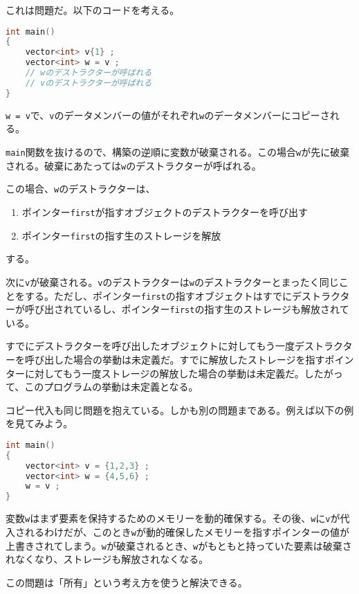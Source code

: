 これは問題だ。以下のコードを考える。

\begin{lstlisting}[language={C++}]
int main()
{
    vector<int> v{1} ;
    vector<int> w = v ;
    // wのデストラクターが呼ばれる
    // vのデストラクターが呼ばれる
}
\end{lstlisting}

\texttt{w = v}で、\texttt{v}のデータメンバーの値がそれぞれ\texttt{w}のデータメンバーにコピーされる。

\texttt{main}関数を抜けるので、構築の逆順に変数が破棄される。この場合\texttt{w}が先に破棄される。破棄にあたっては\texttt{w}のデストラクターが呼ばれる。

この場合、\texttt{w}のデストラクターは、
\begin{enumerate}
\def\labelenumi{\arabic{enumi}.}
\item
  ポインター\texttt{first}が指すオブジェクトのデストラクターを呼び出す
\item
  ポインター\texttt{first}の指す生のストレージを解放
\end{enumerate}
する。

次に\texttt{v}が破棄される。\texttt{v}のデストラクターは\texttt{w}のデストラクターとまったく同じことをする。ただし、ポインター\texttt{first}の指すオブジェクトはすでにデストラクターが呼び出されているし、ポインター\texttt{first}の指す生のストレージも解放されている。

すでにデストラクターを呼び出したオブジェクトに対してもう一度デストラクターを呼び出した場合の挙動は未定義だ。すでに解放したストレージを指すポインターに対してもう一度ストレージの解放した場合の挙動は未定義だ。したがって、このプログラムの挙動は未定義となる。

コピー代入も同じ問題を抱えている。しかも別の問題まである。例えば以下の例を見てみよう。

\begin{lstlisting}[language={C++}]
int main()
{
    vector<int> v = {1,2,3} ;
    vector<int> w = {4,5,6} ;
    w = v ;
}
\end{lstlisting}

変数\texttt{w}はまず要素を保持するためのメモリーを動的確保する。その後、\texttt{w}に\texttt{v}が代入されるわけだが、このとき\texttt{w}が動的確保したメモリーを指すポインターの値が上書きされてしまう。\texttt{w}が破棄されるとき、\texttt{w}がもともと持っていた要素は破棄されなくなり、ストレージも解放されなくなる。


この問題は「所有」という考え方を使うと解決できる。

